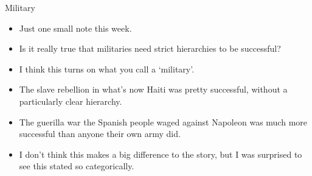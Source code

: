 \documentclass[
  ignorenonframetext,
]{beamer}
\providecommand{\tightlist}{%
  \setlength{\itemsep}{0pt}\setlength{\parskip}{0pt}}
\begin{document}
\begin{frame}{Military}
\protect\hypertarget{military}{}
\begin{itemize}
\tightlist
\item
  Just one small note this week.
\item
  Is it really true that militaries need strict hierarchies to be
  successful?
\item
  I think this turns on what you call a `military'.
\item
  The slave rebellion in what's now Haiti was pretty successful, without
  a particularly clear hierarchy.
\item
  The guerilla war the Spanish people waged against Napoleon was much
  more successful than anyone their own army did.
\item
  I don't think this makes a big difference to the story, but I was
  surprised to see this stated so categorically.
\end{itemize}
\end{frame}
\end{document}

